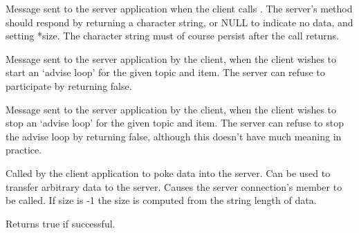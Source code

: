 \label{wxddeconnectiononrequest}


Message sent to the server application when the client calls 
. The
server's  method
should respond by returning a character string, or NULL to
indicate no data, and setting *size. The character string must of
course persist after the call returns.

\label{wxddeconnectiononstartadvise}


Message sent to the server application by the client, when the client
wishes to start an `advise loop' for the given topic and item. The
server can refuse to participate by returning false.

\label{wxddeconnectiononstopadvise}


Message sent to the server application by the client, when the client
wishes to stop an `advise loop' for the given topic and item. The
server can refuse to stop the advise loop by returning false, although
this doesn't have much meaning in practice.

\label{wxddeconnectionpoke}


Called by the client application to poke data into the server.
Can be used to transfer arbitrary data to the server. Causes the
server connection's  member to
be called. If size is -1 the size is computed from the string
length of data.

Returns true if successful.

\label{wxddeconnectionrequest}


